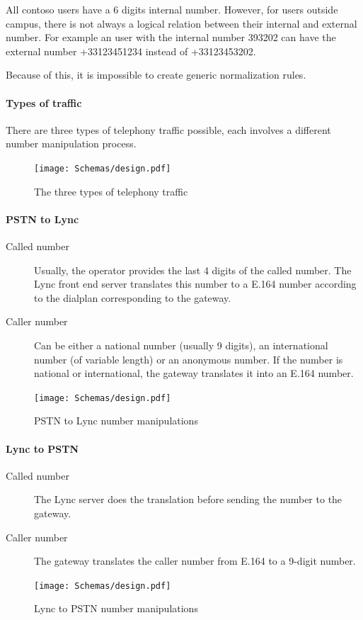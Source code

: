 	All contoso users have a 6 digits internal number. However, for users outside campus, there is not always a logical relation between their internal and external number. For example an user with the internal number 393202 can have the external number +33123451234 instead of +33123453202.
	
	Because of this, it is impossible to create generic normalization rules.
	
	
	\paragraph{Types of traffic}
	There are three types of telephony traffic possible, each involves a different number manipulation process.
	\begin{figure}[H]
		\centering
		\texttt{[image: Schemas/design.pdf]}
		\caption{The three types of telephony traffic}
		\label{fig:case_traffic_types}
	\end{figure}
	
	\paragraph{PSTN to Lync}
	\begin{description}
		\item[Called number] Usually, the operator provides the last 4 digits of the called number. The Lync front end server translates this number to a E.164 number according to the dialplan corresponding to the gateway.
		\item[Caller number] Can be either a national number (usually 9 digits), an international number (of variable length) or an anonymous number. If the number is national or international, the gateway translates it into an E.164 number.
	\end{description}
	\begin{figure}[H]
		\centering
		\texttt{[image: Schemas/design.pdf]}
		\caption{PSTN to Lync number manipulations}
		\label{fig:case_pstn_to_lync}
	\end{figure}

	\paragraph{Lync to PSTN}
	\begin{description}
		\item[Called number] The Lync server does the translation before sending the number to the gateway.
		\item[Caller number] The gateway translates the caller number from E.164 to a 9-digit number.
	\end{description}
	\begin{figure}[H]
		\centering
		\texttt{[image: Schemas/design.pdf]}
		\caption{Lync to PSTN number manipulations}
		\label{fig:case_lync_to_pstn}
	\end{figure}

